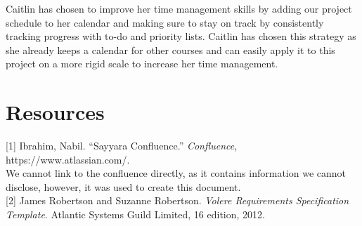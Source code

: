\documentclass[12pt]{article}
\begin{document}
Caitlin has chosen to improve her time management skills by adding our project schedule to her calendar and making sure to stay on track by consistently tracking progress with to-do and priority lists. Caitlin has chosen this strategy as she already keeps a calendar for other courses and can easily apply it to this project on a more rigid scale to increase her time management.

\section{Resources}

\label{1}[1] Ibrahim, Nabil. “Sayyara Confluence.” \textit{Confluence}, https://www.atlassian.com/.\\ We cannot link to the confluence directly, as it contains information we cannot disclose, however, it was used to create this document.\\


\noindent \label{2}[2] James Robertson and Suzanne Robertson. \emph{Volere Requirements Specification Template}. Atlantic Systems Guild Limited, 16 edition, 2012.
\end{document}

